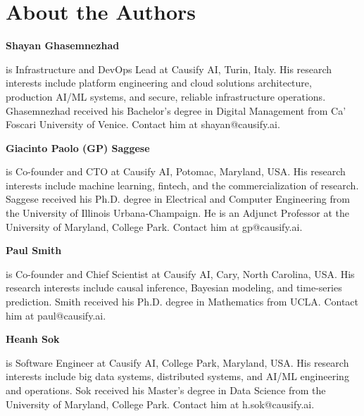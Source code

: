 \documentclass[11pt, reqno]{amsart}
\newenvironment{authorbio}[1]{%
  \par\noindent\textbf{#1}\nobreakspace\ignorespaces
}{\par\vspace{0.4em}}
\begin{document}



\section*{About the Authors}

\begin{authorbio}{Shayan Ghasemnezhad}
is Infrastructure and DevOps Lead at Causify AI, Turin, Italy. His research interests include platform engineering and cloud solutions architecture, production AI/ML systems, and secure, reliable infrastructure operations. Ghasemnezhad received his Bachelor's degree in Digital Management from Ca' Foscari University of Venice. Contact him at shayan@causify.ai.
\end{authorbio}

\begin{authorbio}{Giacinto Paolo (GP) Saggese}
is Co-founder and CTO at Causify AI, Potomac, Maryland, USA. His research interests include machine learning, fintech, and the commercialization of research. Saggese received his Ph.D. degree in Electrical and Computer Engineering from the University of Illinois Urbana-Champaign. He is an Adjunct Professor at the University of Maryland, College Park. Contact him at gp@causify.ai.
\end{authorbio}

\begin{authorbio}{Paul Smith}
is Co-founder and Chief Scientist at Causify AI, Cary, North Carolina, USA. His research interests include causal inference, Bayesian modeling, and time-series prediction. Smith received his Ph.D. degree in Mathematics from UCLA. Contact him at paul@causify.ai.
\end{authorbio}

\begin{authorbio}{Heanh Sok}
is Software Engineer at Causify AI, College Park, Maryland, USA. His research interests include big data systems, distributed systems, and AI/ML engineering and operations. Sok received his Master's degree in Data Science from the University of Maryland, College Park. Contact him at h.sok@causify.ai.
\end{authorbio}
\end{document}
